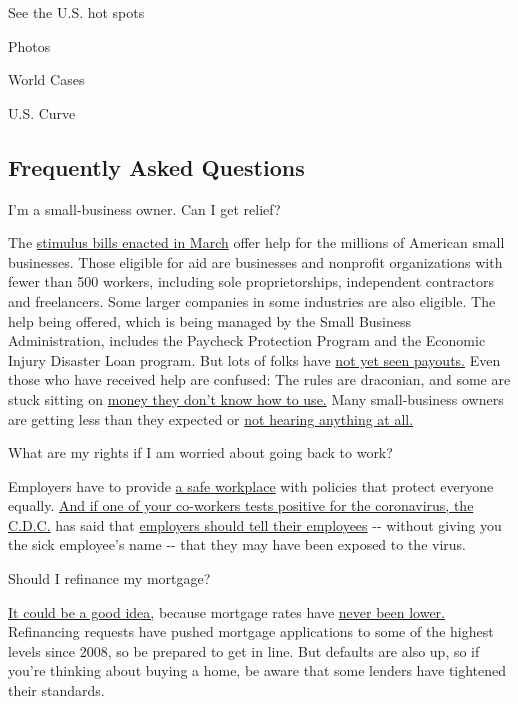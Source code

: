 See the U.S. hot spots

Photos

World Cases

U.S. Curve

\hypertarget{frequently-asked-questions}{%
\subsection{Frequently Asked
Questions}\label{frequently-asked-questions}}

 I'm a small-business owner. Can I get relief?

The
\href{https://www.nytimes.com/article/small-business-loans-stimulus-grants-freelancers-coronavirus.html}{stimulus
bills enacted in March} offer help for the millions of American small
businesses. Those eligible for aid are businesses and nonprofit
organizations with fewer than 500 workers, including sole
proprietorships, independent contractors and freelancers. Some larger
companies in some industries are also eligible. The help being offered,
which is being managed by the Small Business Administration, includes
the Paycheck Protection Program and the Economic Injury Disaster Loan
program. But lots of folks have
\href{https://www.nytimes.com/interactive/2020/05/07/business/small-business-loans-coronavirus.html}{not
yet seen payouts.} Even those who have received help are confused: The
rules are draconian, and some are stuck sitting on
\href{https://www.nytimes.com/2020/05/02/business/economy/loans-coronavirus-small-business.html}{money
they don't know how to use.} Many small-business owners are getting less
than they expected or
\href{https://www.nytimes.com/2020/06/10/business/Small-business-loans-ppp.html}{not
hearing anything at all.}

 What are my rights if I am worried about going back to work?

Employers have to provide
\href{https://www.osha.gov/SLTC/covid-19/standards.html}{a safe
workplace} with policies that protect everyone equally.
\href{https://www.nytimes.com/article/coronavirus-money-unemployment.html}{And
if one of your co-workers tests positive for the coronavirus, the
C.D.C.} has said that
\href{https://www.cdc.gov/coronavirus/2019-ncov/community/guidance-business-response.html}{employers
should tell their employees} -\/- without giving you the sick employee's
name -\/- that they may have been exposed to the virus.

 Should I refinance my mortgage?

\href{https://www.nytimes.com/article/coronavirus-money-unemployment.html}{It
could be a good idea,} because mortgage rates have
\href{https://www.nytimes.com/2020/07/16/business/mortgage-rates-below-3-percent.html}{never
been lower.} Refinancing requests have pushed mortgage applications to
some of the highest levels since 2008, so be prepared to get in line.
But defaults are also up, so if you're thinking about buying a home, be
aware that some lenders have tightened their standards.

